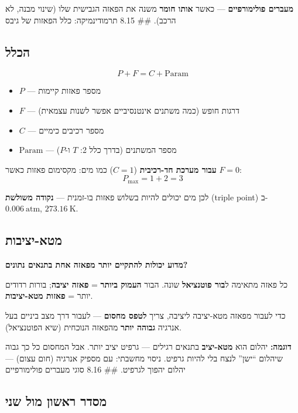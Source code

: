 \documentclass[
  hebrew,
  letterpaper,
  DIV=11,
  numbers=noendperiod]{scrreprt}
\providecommand{\tightlist}{%
  \setlength{\itemsep}{0pt}\setlength{\parskip}{0pt}}
\begin{document}
\textbf{מעברים פולימורפיים} --- כאשר \textbf{אותו חומר} משנה את הפאזה
הגבישית שלו (שינוי מבנה, לא הרכב). \#\# 8.15 תרמודינמיקה: כלל הפאזות של
גיבס

\subsection{הכלל}\label{ux5d4ux5dbux5dcux5dc-1}

\[P + F = C + \text{Param}\]

\begin{itemize}
\tightlist
\item
  \(P\) --- מספר פאזות קיימות
\item
  \(F\) --- דרגות חופש (כמה משתנים אינטנסיביים אפשר לשנות עצמאית)
\item
  \(C\) --- מספר רכיבים כימיים
\item
  \(\text{Param}\) --- מספר המשתנים (בדרך כלל 2: \(T\) ו-\(P\))
\end{itemize}

\textbf{עבור מערכת חד-רכיבית} (\(C=1\)) כמו מים: מקסימום פאזות כאשר
\(F=0\): \[P_\text{max} = 1 + 2 = 3\]

לכן מים יכולים להיות בשלוש פאזות בו-זמנית --- \textbf{נקודה משולשת}
(triple point) ב-\(0.006\ \text{atm}\), \(273.16\ \text{K}\).

\subsection{מטא-יציבות}\label{ux5deux5d8ux5d0-ux5d9ux5e6ux5d9ux5d1ux5d5ux5ea}

\textbf{מדוע יכולות להתקיים יותר מפאזה אחת בתנאים נתונים?}

כל פאזה מתאימה ל\textbf{בור פוטנציאל} שונה. הבור \textbf{העמוק ביותר} =
\textbf{פאזה יציבה}; בורות רדודים יותר = \textbf{פאזות מטא-יציבות}.

כדי לעבור מפאזה מטא-יציבה ליציבה, צריך \textbf{לטפס מחסום} --- לעבור דרך
מצב ביניים בעל אנרגיה \textbf{גבוהה יותר} מהפאזה הנוכחית (שיא
הפוטנציאל).

\textbf{דוגמה:} יהלום הוא \textbf{מטא-יציב} בתנאים רגילים --- גרפיט יציב
יותר. אבל המחסום כל כך גבוה שיהלום ``ישן'' לנצח בלי להיות גרפיט. ניסוי
מחשבתי: עם מספיק אנרגיה (חום עצום) --- יהלום יהפוך לגרפיט. \#\# 8.16
סוגי מעברים פולימורפיים

\subsection{מסדר ראשון מול
שני}\label{ux5deux5e1ux5d3ux5e8-ux5e8ux5d0ux5e9ux5d5ux5df-ux5deux5d5ux5dc-ux5e9ux5e0ux5d9}
\end{document}

